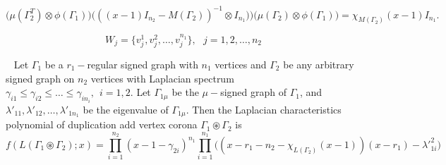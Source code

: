 \documentclass[10pt,a4paper]{amsart}
\begin{document}
    \begin{equation}\label{Eqn2}
        \big(\mu(\Gamma_2^T)\otimes\phi(\Gamma_1)\big)\big(((x-1)I_{n_2}-M(\Gamma_2))^{-1}\otimes I_{n_1})\big)\big(\mu(\Gamma_2)\otimes \phi(\Gamma_1)\big)=\chi_{M(\Gamma_2)}(x-1)I_{n_1}.
    \end{equation}

    \begin{equation} \label{eqn2}
                W_j=\big\{v_j^1,v_j^2,\ldots,v_j^{n_1}\big\}, ~~~j=1,2,\ldots,n_2
    \end{equation}

    \begin{theorem}~\label{TH2}
         Let $\Gamma_1$ be a $r_1-$regular signed graph with $n_1$ vertices and $\Gamma_2$ be any arbitrary signed graph on $n_2$ vertices with Laplacian spectrum $\gamma_{i1}\leq\gamma_{i2}\leq\ldots\leq\gamma_{in_i},~~i=1,2.$ Let $\Gamma_{1\mu}$ be the $\mu-$signed graph of $\Gamma_1$, and $\lambda'_{11},\lambda'_{12},\ldots,\lambda'_{1n_1}$ be the eigenvalue of $\Gamma_{1\mu}.$ Then the Laplacian characteristics polynomial of duplication add vertex corona $\Gamma_1\circledast\Gamma_2$ is $$f(L(\Gamma_1\circledast\Gamma_2);x)=\prod_{i=1}^{n_2}(x-1-\gamma_{2i})^{n_1} \prod_{i=1}^{n_1}\big((x-r_1-n_2-\chi_{L(\Gamma_2)}(x-1))(x-r_1)-{\lambda'}_{1i}^2\big)$$
    \end{theorem}
\end{document}
